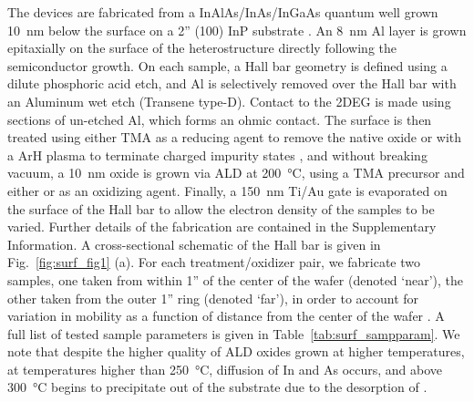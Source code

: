 The devices are fabricated from a InAlAs/InAs/InGaAs quantum well grown \SI{10}{\nano\meter} below the surface on a 2'' (100) InP substrate \cite{manfra_hmob}. An \SI{8}{\nano\meter} Al layer is grown epitaxially on the surface of the heterostructure directly following the semiconductor growth. On each sample, a Hall bar geometry is defined using a dilute phosphoric acid etch, and Al is selectively removed over the Hall bar with an Aluminum wet etch (Transene type-D). Contact to the 2DEG is made using sections of un-etched Al, which forms an ohmic contact. The surface is then treated using either TMA as a reducing agent to remove the native oxide \cite{ingaas_redux,iiiv_cleanup} or with a ArH plasma to terminate charged impurity states \cite{BELL1998125}, and without breaking vacuum, a \SI{10}{\nano\meter}  oxide is grown via ALD at \SI{200}{\celsius}, using a TMA precursor and either  or  as an oxidizing agent. Finally, a \SI{150}{\nano\meter} Ti/Au gate is evaporated on the surface of the Hall bar to allow the electron density of the samples to be varied. Further details of the fabrication are contained in the Supplementary Information. A cross-sectional schematic of the Hall bar is given in Fig.~\ref{fig:surf_fig1} (a). For each treatment/oxidizer pair, we fabricate two samples, one taken from within 1'' of the center of the wafer (denoted `near'), the other taken from the outer 1'' ring (denoted `far'), in order to account for variation in mobility as a function of distance from the center of the wafer \cite{watson_thesis}. A full list of tested sample parameters is given in Table~\ref{tab:surf_sampparam}. We note that despite the higher quality of ALD oxides grown at higher temperatures, at temperatures higher than \SI{250}{\celsius}, diffusion of In and As occurs, and above \SI{300}{\celsius}  begins to precipitate out of the substrate due to the desorption of  \cite{PhysRevB.48.2807}.

